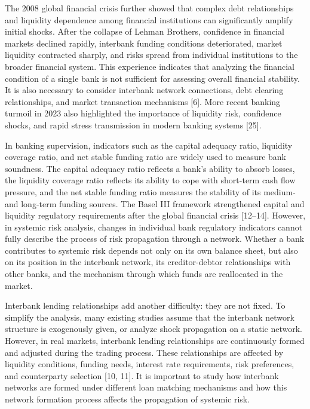 The 2008 global financial crisis further showed that complex debt
relationships and liquidity dependence among financial institutions can
significantly amplify initial shocks. After the collapse of Lehman
Brothers, confidence in financial markets declined rapidly, interbank
funding conditions deteriorated, market liquidity contracted sharply,
and risks spread from individual institutions to the broader financial
system. This experience indicates that analyzing the financial condition
of a single bank is not sufficient for assessing overall financial
stability. It is also necessary to consider interbank network
connections, debt clearing relationships, and market transaction
mechanisms {[}6{]}. More recent banking turmoil in 2023 also highlighted
the importance of liquidity risk, confidence shocks, and rapid stress
transmission in modern banking systems {[}25{]}.

In banking supervision, indicators such as the capital adequacy ratio,
liquidity coverage ratio, and net stable funding ratio are widely used
to measure bank soundness. The capital adequacy ratio reflects a bank's
ability to absorb losses, the liquidity coverage ratio reflects its
ability to cope with short-term cash flow pressure, and the net stable
funding ratio measures the stability of its medium- and long-term
funding sources. The Basel III framework strengthened capital and
liquidity regulatory requirements after the global financial
crisis {[}12--14{]}. However, in systemic risk analysis,
changes in individual bank regulatory indicators cannot fully describe
the process of risk propagation through a network. Whether a bank
contributes to systemic risk depends not only on its own balance sheet,
but also on its position in the interbank network, its creditor-debtor
relationships with other banks, and the mechanism through which funds
are reallocated in the market.

Interbank lending relationships add another difficulty: they are not
fixed. To simplify the analysis, many existing studies assume that the
interbank network structure is exogenously given, or analyze shock
propagation on a static network. However, in real markets, interbank
lending relationships are continuously formed and adjusted during the
trading process. These relationships are affected by liquidity
conditions, funding needs, interest rate requirements, risk preferences,
and counterparty selection {[}10, 11{]}. It is important to study how
interbank networks are formed under different loan matching mechanisms
and how this network formation process affects the propagation of
systemic risk.

